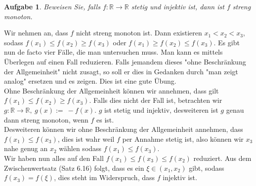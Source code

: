 \documentclass[a4paper, 20]{exam}
\newtheorem{ex}{Aufgabe}
\newcommand\RR{\mathbb{R}}
\begin{document}
\begin{ex}
Beweisen Sie, falls $f:\RR \longrightarrow \RR$ stetig und injektiv ist, dann ist $f$ streng monoton.
\end{ex}
\begin{solution}
Wir nehmen an, dass $f$ nicht streng monoton ist. Dann existieren $x_1 < x_2 < x_3$, sodass $f(x_1) \leq f(x_2) \geq f(x_3)$ oder $f(x_1)\geq f(x_2) \leq f(x_3)$. Es gibt nun de facto vier F\"alle, die man untersuchen muss. Man kann es mittels \"Uberlegen auf einen Fall reduzieren. Falls jemandem dieses "ohne Beschr\"ankung der Allgemeinheit" nicht zusagt, so soll er dies in Gedanken durch "man zeigt analog" ersetzen und es zeigen. Dies ist eine gute \"Ubung.\\
Ohne Beschr\"ankung der Allgemeinheit k\"onnen wir annehmen, dass gilt $f(x_1) \leq f(x_2) \geq f(x_3)$. Falls dies nicht der Fall ist, betrachten wir $g: \RR \longrightarrow \RR,~ g(x):=\ -f(x)$. $g$ ist stetig und injektiv, desweiteren ist $g$ genau dann streng monoton, wenn $f$ es ist.\\
Desweiteren k\"onnen wir ohne Beschr\"ankung der Allgemeinheit annehmen, dass $f(x_1) \leq f(x_3)$, dies ist wahr weil $f$ per Annahme stetig ist, also können wir $x_3$ nahe genug an $x_2$ wählen sodass $f(x_1) \leq f(x_3)$.\\
Wir haben nun alles auf den Fall $f(x_1)\leq f(x_3) \leq f(x_2)$ reduziert. Aus dem Zwischenwertsatz (Satz 6.16) folgt, dass es ein $\xi \in (x_1, x_2)$ gibt, sodass $f(x_3)= f(\xi)$, dies steht im Widerspruch, dass $f$ injektiv ist.
\end{solution} 
\end{document}
